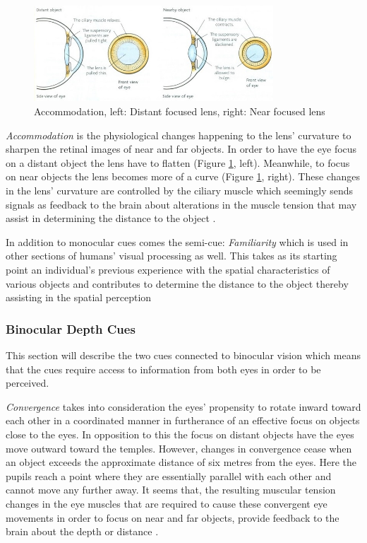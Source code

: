 \begin{figure}[h!]
   \centering
   \includegraphics[width=0.8\textwidth]{figures/cue10.jpg}
   \caption{Accommodation, left: Distant focused lens, right: Near focused lens \cite{Biology2014}}\label{fig:cue10}
\end{figure}

\textit{Accommodation} is the physiological changes happening to the lens’ curvature to sharpen the retinal images of near and far objects. In order to have the eye focus on a distant object the lens have to flatten (Figure \ref{fig:cue10}, left). Meanwhile, to focus on near objects the lens becomes more of a curve (Figure \ref{fig:cue10}, right). These changes in the lens’ curvature are controlled by the ciliary muscle which seemingly sends signals as feedback to the brain about alterations in the muscle tension that may assist in determining the distance to the object \cite{Gale}.

In addition to monocular cues comes the semi-cue: \textit{Familiarity} which is used in other sections of humans’ visual processing as well. This takes as its starting point an individual’s previous experience with the spatial characteristics of various objects and contributes to determine the distance to the object thereby assisting in the spatial perception \cite{Gale}

\subsubsection{Binocular Depth Cues}
This section will describe the two cues connected to binocular vision which means that the cues require access to information from both eyes in order to be perceived.

\textit{Convergence} takes into consideration the eyes’ propensity to rotate inward toward each other in a coordinated manner in furtherance of an effective focus on objects close to the eyes. In opposition to this the focus on distant objects have the eyes move outward toward the temples. However, changes in convergence cease when an object exceeds the approximate distance of six metres from the eyes. Here the pupils reach a point where they are essentially parallel with each other and cannot move any further away. It seems that, the resulting muscular tension changes in the eye muscles that are required to cause these convergent eye movements in order to focus on near and far objects, provide feedback to the brain about the depth or distance \cite{Gale}.

